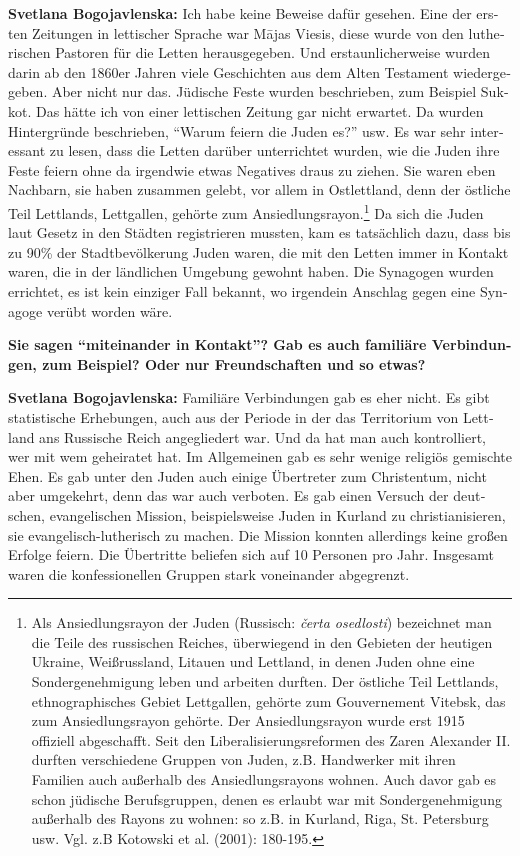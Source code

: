 \begin{otherlanguage}{ngerman}
\textbf{Svetlana Bogojavlenska:} Ich habe keine Beweise dafür gesehen. Eine der ersten Zeitungen in lettischer Sprache war Mājas Viesis, diese wurde von den lutherischen Pastoren für die Letten herausgegeben. Und erstaunlicherweise wurden darin ab den 1860er Jahren viele Geschichten aus dem Alten Testament wiedergegeben. Aber nicht nur das. Jüdische Feste wurden beschrieben, zum Beispiel Sukkot. Das hätte ich von einer lettischen Zeitung gar nicht erwartet. Da wurden Hintergründe beschrieben, "`Warum feiern die Juden es?"' usw. Es war sehr interessant zu lesen, dass die Letten darüber unterrichtet wurden, wie die Juden ihre Feste feiern ohne da irgendwie etwas Negatives draus zu ziehen. Sie waren eben Nachbarn, sie haben zusammen gelebt, vor allem in Ostlettland, denn der östliche Teil Lettlands, Lettgallen, gehörte zum Ansiedlungsrayon.\footnote{Als Ansiedlungsrayon der Juden (Russisch: \textit{čerta osedlosti}) bezeichnet man die Teile des russischen Reiches, überwiegend in den Gebieten der heutigen Ukraine, Weißrussland, Litauen und Lettland, in denen Juden ohne eine Sondergenehmigung leben und arbeiten durften. Der östliche Teil Lettlands, ethnographisches Gebiet Lettgallen, gehörte zum Gouvernement Vitebsk, das zum Ansiedlungsrayon gehörte. Der Ansiedlungsrayon wurde erst 1915 offiziell abgeschafft. Seit den Liberalisierungsreformen des Zaren Alexander II. durften verschiedene Gruppen von Juden, z.B. Handwerker mit ihren Familien auch außerhalb des Ansiedlungsrayons wohnen. Auch davor gab es schon jüdische Berufsgruppen, denen es erlaubt war mit Sondergenehmigung außerhalb des Rayons zu wohnen: so z.B. in Kurland, Riga, St. Petersburg usw. Vgl. z.B Kotowski et al. (2001): 180-195.} Da sich die Juden laut Gesetz in den Städten registrieren mussten, kam es tatsächlich dazu, dass bis zu 90\% der Stadtbevölkerung Juden waren, die mit den Letten immer in Kontakt waren, die in der ländlichen Umgebung gewohnt haben. Die Synagogen wurden errichtet, es ist kein einziger Fall bekannt, wo irgendein Anschlag gegen eine Synagoge verübt worden wäre.

\textbf{Sie sagen "`miteinander in Kontakt"'? Gab es auch familiäre Verbindungen, zum Beispiel? Oder nur Freundschaften und so etwas?}

\textbf{Svetlana Bogojavlenska:} Familiäre Verbindungen gab es eher nicht. Es gibt statistische Erhebungen, auch aus der Periode in der das Territorium von Lettland ans Russische Reich angegliedert war. Und da hat man auch kontrolliert, wer mit wem geheiratet hat. Im Allgemeinen gab es sehr wenige religiös gemischte Ehen. Es gab unter den Juden auch einige Übertreter zum Christentum, nicht aber umgekehrt, denn das war auch verboten. Es gab einen Versuch der deutschen, evangelischen Mission, beispielsweise Juden in Kurland zu christianisieren, sie evangelisch-lutherisch zu machen. Die Mission konnten allerdings keine großen Erfolge feiern. Die Übertritte beliefen sich auf 10 Personen pro Jahr. Insgesamt waren die konfessionellen Gruppen stark voneinander abgegrenzt.


\end{otherlanguage}
